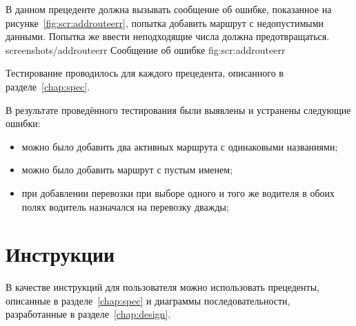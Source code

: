 В данном прецеденте должна вызывать сообщение об ошибке, показанное на
рисунке~\ref{fig:scr:addrouteerr}, попытка добавить маршрут с недопустимыми
данными. Попытка же ввести неподходящие числа должна предотвращаться.
\image
    {screenshots/addrouteerr}
    {Сообщение об ошибке}
    {fig:scr:addrouteerr}

Тестирование проводилось для каждого прецедента, 
описанного в разделе~\ref{chap:spec}. 

В результате проведённого тестирования были 
выявлены и устранены следующие ошибки: 
\begin{itemize}
    \item можно было добавить два активных маршрута с одинаковыми названиями;
    \item можно было добавить маршрут с пустым именем;
    \item при добавлении перевозки при выборе одного и того же водителя 
        в обоих полях водитель назначался на перевозку дважды;
\end{itemize}


\section{Инструкции}
В качестве инструкций для пользователя можно использовать 
прецеденты, описанные в разделе~\ref{chap:spec}
и диаграммы последовательности, разработанные в разделе~\ref{chap:design}.
